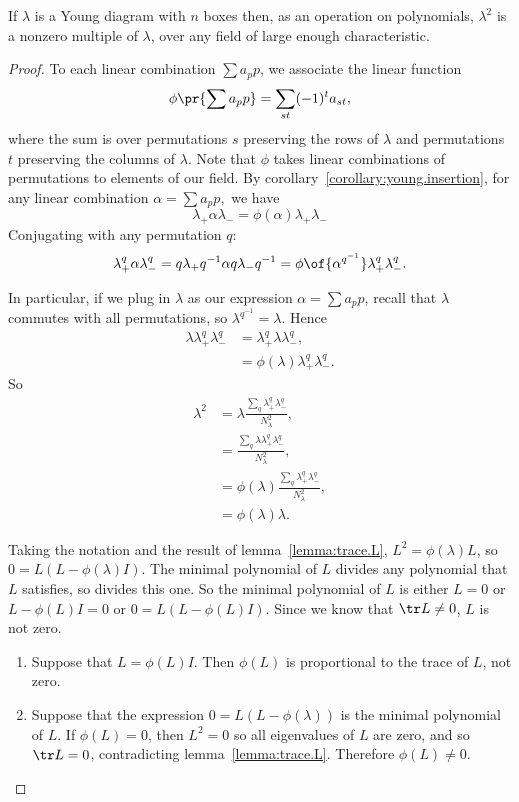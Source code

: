 \begin{proposition}\label{prop:idempotent}
If \(\lambda\) is a Young diagram with \(n\) boxes then, as an operation on polynomials, \(\lambda^2\) is a nonzero multiple of \(\lambda\), over any field of large enough characteristic.
\end{proposition}
\begin{proof}
To each linear combination \(\sum a_p p\), we associate the linear function
\[
\phi\pr{\sum a_p p} = \sum_{st} (-1)^t a_{st},
\]
where the sum is over permutations \(s\) preserving the rows of \(\lambda\) and permutations \(t\) preserving the columns of \(\lambda\).
Note that \(\phi\) takes linear combinations of permutations to elements of our field.
By corollary~\vref{corollary:young.insertion}, for any linear combination
\(
\alpha=\sum a_p p,
\)
we have
\[
\lambda_+ \alpha \lambda_- = \phi(\alpha) \lambda_+ \lambda_-
\]
Conjugating with any permutation \(q\):
\[
\lambda^q_+ \alpha \lambda^q_- = q\lambda_+ q^{-1} \alpha q \lambda_- q^{-1} = \phi\of{\alpha^{q^{-1}}}\lambda^q_+ \lambda^q_-.
\]

In particular, if we plug in \(\lambda\) as our expression \(\alpha=\sum a_p p\), recall that \(\lambda\) commutes with all permutations, so \(\lambda^{q^{-1}}=\lambda\).
Hence
\begin{align*}
\lambda \lambda^q_+ \lambda^q_- 
&=
\lambda^q_+ \lambda \lambda^q_-,
\\
&=
\phi(\lambda) \lambda^q_+\lambda^q_-.
\end{align*}
So
\begin{align*}
\lambda^2
&=
\lambda 
\frac{\sum_q\lambda^q_+\lambda^q_-}
{N_{\lambda}^2},
\\
&=
\frac{\sum_q\lambda \lambda^q_+ \lambda^q_-}
{N_{\lambda}^2},
\\
&=
\phi(\lambda) \frac{\sum_q\lambda^q_+\lambda^q_-}{N_{\lambda}^2},
\\
&=
\phi(\lambda)\lambda.
\end{align*}

Taking the notation and the result of lemma~\vref{lemma:trace.L}, \(L^2=\phi(\lambda)L\), so \(0=L(L-\phi(\lambda)I)\).
The minimal polynomial of \(L\) divides any polynomial that \(L\) satisfies, so divides this one.
So the minimal polynomial of \(L\) is either \(L=0\) or \(L-\phi(L)I=0\) or \(0=L(L-\phi(L)I)\).
Since we know that \(\tr L \ne 0\), \(L\) is not zero.
\begin{enumerate}
\item
Suppose that \(L=\phi(L)I\).
Then \(\phi(L)\) is proportional to the trace of \(L\), not zero.
\item
Suppose that the expression \(0=L(L-\phi(\lambda))\) is the minimal polynomial of \(L\).
If \(\phi(L)=0\), then \(L^2=0\) so all eigenvalues of \(L\) are zero, and so \(\tr L=0\), contradicting lemma~\ref{lemma:trace.L}.
Therefore \(\phi(L)\ne 0\).
\end{enumerate}
\end{proof}
